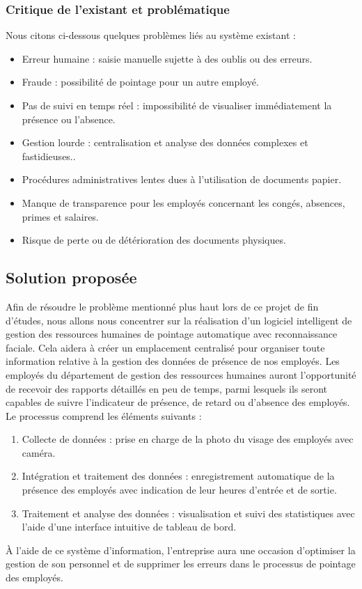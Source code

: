 \subsubsection{Critique de l'existant et problématique}
Nous citons ci-dessous quelques problèmes liés au système existant :
\begin{itemize}
 \item  Erreur humaine : saisie manuelle sujette à des oublis ou des erreurs.

\item Fraude : possibilité de pointage pour un autre employé.

\item Pas de suivi en temps réel : impossibilité de visualiser immédiatement la présence ou l’absence.

\item Gestion lourde : centralisation et analyse des données complexes et fastidieuses..
\item Procédures administratives lentes dues à l’utilisation de documents papier. 
\item Manque de transparence pour les employés concernant les congés, absences, primes et salaires. 
\item Risque de perte ou de détérioration des documents physiques.
\end{itemize}

\subsection{Solution proposée}
Afin de résoudre le problème mentionné plus haut lors de ce projet de fin d'études,
nous allons nous concentrer sur la réalisation d'un logiciel intelligent de gestion des ressources humaines de pointage automatique avec reconnaissance faciale.
Cela aidera à créer un emplacement centralisé pour organiser toute information relative à la gestion des données de présence de nos employés.
Les employés du département de gestion des ressources humaines auront l'opportunité de recevoir des rapports détaillés en peu de temps, parmi lesquels ils seront capables de suivre l'indicateur de présence, de retard ou d'absence des employés.
Le processus comprend les éléments suivants :
\begin{enumerate}
    \item  Collecte de données : prise en charge de la photo du visage des employés avec caméra.
\item   Intégration et traitement des données : enregistrement automatique de la présence des employés avec indication de leur heures d'entrée et de sortie.
\item  Traitement et analyse des données : visualisation et suivi des statistiques avec l'aide d'une interface intuitive de tableau de bord.
\end{enumerate}
À l'aide de ce système d'information, l'entreprise aura une occasion d'optimiser la gestion de son personnel et de supprimer les erreurs dans le processus de pointage des employés.


